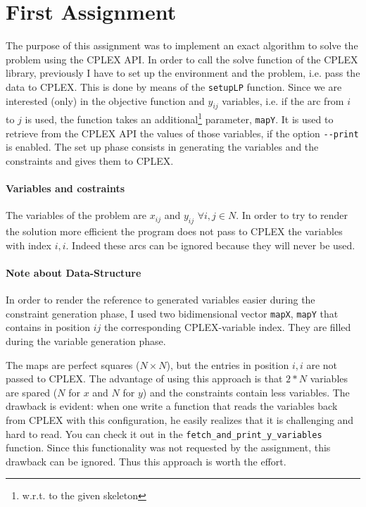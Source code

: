 \section{First Assignment}
The purpose of this assignment was to implement an exact algorithm to solve the problem using the CPLEX API.
In order to call the solve function of the CPLEX library, previously I have to set up the environment
and the problem, i.e. pass the data to CPLEX. This is done by means of the \verb|setupLP| function.
Since we are interested (only) in the objective function and $y_{ij}$ variables, i.e. if the arc from $i$
to $j$ is used, the function takes
an additional\footnote{w.r.t. to the given skeleton} parameter,  \verb|mapY|. It is used to
retrieve from the CPLEX API the values of those variables, if the option  \verb|--print| is enabled.
The set up phase consists in generating the variables and the constraints and gives them to CPLEX.

\paragraph{ Variables and costraints}
The variables of the problem are $x_{ij}$ and $y_{ij}$ $\forall i,j \in N$.
In order to try to render the solution more efficient the program does not pass
to CPLEX the variables with index $i,i$. Indeed these arcs can be ignored because
they will never be used.


\paragraph{Note about Data-Structure} In order to render the reference to generated variables easier
during the constraint generation phase, I used two bidimensional vector \verb|mapX|, \verb|mapY| that contains in position $ij$ 
the corresponding CPLEX-variable index. They are filled during the variable generation phase.

The maps are perfect squares ($N\times N$), but the entries in position $i,i$ are not passed to CPLEX.
The advantage of using this approach is that $2*N$ variables are spared ($N$ for $x$ and $N$ for $y$) and the constraints
contain less variables.
The drawback is evident: when one write a function that reads the variables back from CPLEX with this configuration, he easily realizes
that it is challenging and hard to read.
You can check it out in the \verb|fetch_and_print_y_variables| function.
Since this functionality was not requested by the assignment,
this drawback can be ignored. Thus this approach is worth the effort.



